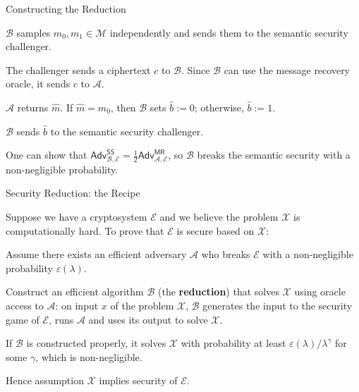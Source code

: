 \documentclass{zkdl-presentation-template}
\begin{document}
    \begin{frame}{Constructing the Reduction}
        \begin{algoen}
            \item $\mathcal{B}$ samples $m_0, m_1 \in \mathcal{M}$ independently and sends them to the semantic security challenger.\pause
            \item The challenger sends a ciphertext $c$ to $\mathcal{B}$. Since $\mathcal{B}$ can use the message recovery oracle, it sends $c$ to $\mathcal{A}$.\pause
            \item $\mathcal{A}$ returns $\widehat{m}$. If $\widehat{m} = m_0$, then $\mathcal{B}$ sets $\widehat{b} := 0$; otherwise, $\widehat{b} := 1$.\pause
            \item $\mathcal{B}$ sends $\widehat{b}$ to the semantic security challenger.
        \end{algoen}
        \pause

        One can show that $\textsf{Adv}^{\textsf{SS}}_{\mathcal{B},\mathcal{E}} =\frac{1}{2} \textsf{Adv}^{\textsf{MR}}_{\mathcal{A},\mathcal{E}}$, so $\mathcal{B}$ breaks the semantic security with a non-negligible probability.
    \end{frame}

    \begin{frame}{Security Reduction: the Recipe}
        \begin{proposition}
            Suppose we have a cryptosystem $\mathcal{E}$ and we believe the problem $\mathcal{X}$ is computationally hard. To prove that $\mathcal{E}$ is secure based on $\mathcal{X}$:
            \begin{algoen}
                \item Assume there exists an efficient adversary $\mathcal{A}$ who breaks $\mathcal{E}$ with a non-negligible probability $\varepsilon(\lambda)$.\pause
                \item Construct an efficient algorithm $\mathcal{B}$ (the \textbf{reduction}) that solves $\mathcal{X}$ using oracle access to $\mathcal{A}$: on input $x$ of the problem $\mathcal{X}$, $\mathcal{B}$ generates the input to the security game of $\mathcal{E}$, runs $\mathcal{A}$ and uses its output to solve $\mathcal{X}$.\pause
                \item If $\mathcal{B}$ is constructed properly, it solves $\mathcal{X}$ with probability at least $\varepsilon(\lambda)/\lambda^{\gamma}$ for some $\gamma$, which is non-negligible.\pause
                \item Hence assumption $\mathcal{X}$ implies security of $\mathcal{E}$.
            \end{algoen}
        \end{proposition}
    \end{frame}
\end{document}

